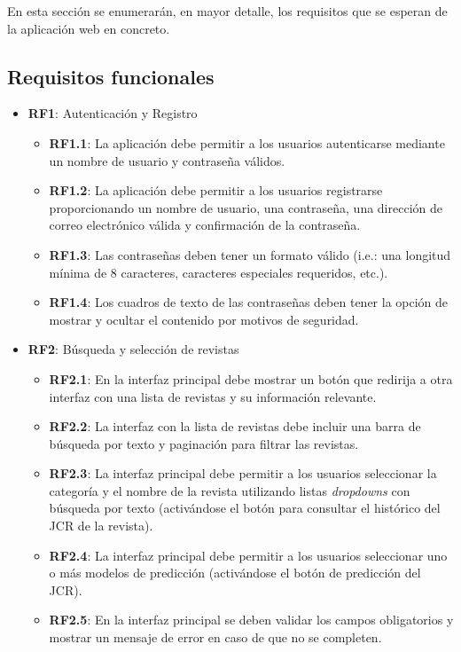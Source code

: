 En esta sección se enumerarán, en mayor detalle, los requisitos que se esperan de la aplicación web en concreto.

\subsection{Requisitos funcionales}

\begin{itemize}
  \item \textbf{RF1}: Autenticación y Registro
  \begin{itemize}
    \item \textbf{RF1.1}: La aplicación debe permitir a los usuarios autenticarse mediante un nombre de usuario y contraseña válidos.
    \item \textbf{RF1.2}: La aplicación debe permitir a los usuarios registrarse proporcionando un nombre de usuario, una contraseña, una dirección de correo electrónico válida y confirmación de la contraseña.
    \item \textbf{RF1.3}: Las contraseñas deben tener un formato válido (i.e.: una longitud mínima de 8 caracteres, caracteres especiales requeridos, etc.).
    \item \textbf{RF1.4}: Los cuadros de texto de las contraseñas deben tener la opción de mostrar y ocultar el contenido por motivos de seguridad.
  \end{itemize}
  
  \item \textbf{RF2}: Búsqueda y selección de revistas
  \begin{itemize}
    \item \textbf{RF2.1}: En la interfaz principal debe mostrar un botón que redirija a otra interfaz con una lista de revistas y su información relevante.
    \item \textbf{RF2.2}: La interfaz con la lista de revistas debe incluir una barra de búsqueda por texto y paginación para filtrar las revistas.
    \item \textbf{RF2.3}: La interfaz principal debe permitir a los usuarios seleccionar la categoría y el nombre de la revista utilizando listas \textit{dropdowns} con búsqueda por texto (activándose el botón para consultar el histórico del JCR de la revista).
    \item \textbf{RF2.4}: La interfaz principal debe permitir a los usuarios seleccionar uno o más modelos de predicción (activándose el botón de predicción del JCR).
    \item \textbf{RF2.5}: En la interfaz principal se deben validar los campos obligatorios y mostrar un mensaje de error en caso de que no se completen.
  \end{itemize}


\end{itemize}
